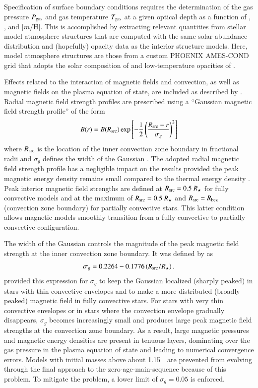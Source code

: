 \documentclass{aa}
\begin{document}
Specification of surface boundary conditions requires the determination of the gas pressure $P_{\rm gas}$ and gas temperature $T_{\rm gas}$ at a given optical depth as a function of \logg, \teff, and [$m$/H]. This is accomplished by extracting relevant quantities from stellar model atmosphere structures that are computed with the same solar abundance distribution and (hopefully) opacity data as the interior structure models. Here, model atmosphere structures are those from a custom PHOENIX AMES-COND grid \citep{Hauschildt1999a, Hauschildt1999b, Dotter2008} that adopts the solar composition of \citet{GS98} and low-temperature opacities of \citet{Ferguson2005}.

Effects related to the interaction of magnetic fields and convection, as well as magnetic fields on the plasma equation of state, are included as described by \citet{FC12b,FC13}. Radial magnetic field strength profiles are prescribed using a ``Gaussian magnetic field strength profile'' of the form
\begin{equation}
	B(r) = B(R_{\rm src}) \exp\left[-\frac{1}{2}\left(\frac{R_{\rm src} - r}{\sigma_g}\right)^2\right]
\end{equation}
where $R_{\rm src}$ is the location of the inner convection zone boundary in fractional radii and $\sigma_g$ defines the width of the Gaussian \citep{FC13}. The adopted radial magnetic field strength profile has a negligible impact on the results provided the peak magnetic energy density remains small compared to the thermal energy density \citep{FC13,FC14,FC14b}.
Peak interior magnetic field strengths are defined at $R_{\rm src} = 0.5\ R_{\star}$ for fully convective models and at the maximum of $R_{\rm src} = 0.5\ R_{\star}$ and $R_{\rm src} = R_{\rm bcz}$ (convection zone boundary) for partially convective stars. This latter condition allows magnetic models smoothly transition from a fully convective to partially convective configuration. 

The width of the Gaussian controls the magnitude of the peak magnetic field strength at the inner convection zone boundary. It was defined by \citet{FC13} as
\begin{equation}
	\sigma_g = 0.2264 - 0.1776 \left(R_{\rm src}/R_{\star}\right).
\end{equation}
\citet{FC13} provided this expression for $\sigma_g$ to keep the Gaussian localized (sharply peaked) in stars with thin convective envelopes and to make a more distributed (broadly peaked) magnetic field in fully convective stars. For stars with very thin convective envelopes or in stars where the convection envelope gradually disappears, $\sigma_g$ becomes increasingly small and produces large peak magnetic field strengths at the convection zone boundary. As a result, large magnetic pressures and magnetic energy densities are present in tenuous layers, dominating over the gas pressure in the plasma equation of state and leading to numerical convergence errors. Models with initial masses above about 1.15~\msun\ are prevented from evolving through the final approach to the zero-age-main-sequence because of this problem. To mitigate the problem, a lower limit of $\sigma_g = 0.05$ is enforced.
\end{document}
